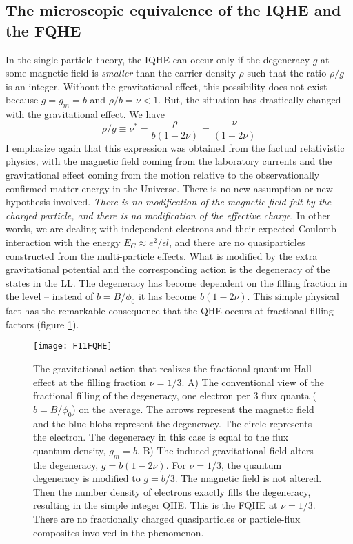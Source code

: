 \documentclass[aps,preprint,12pt,tightenlines]{revtex4}%
\begin{document}
\subsection{The microscopic equivalence of the IQHE and the FQHE}
In the single particle theory, the IQHE can occur only if the degeneracy $g$
at some magnetic field is \emph{smaller} than the carrier density $\rho$ such
that the ratio $\rho/g$ is an integer. Without the gravitational effect, this
possibility does not exist because $g=g_{m}=b$ and $\rho/b=\nu<1$. But, the
situation has drastically changed with the gravitational effect. We have
\begin{equation}
\rho/g\equiv\nu^{\ast}=\frac{\rho}{b\left(  1-2\nu\right)  }=\frac{\nu
}{\left(  1-2\nu\right)  } \label{qhe-ratio}%
\end{equation}
I emphasize again that this expression was obtained from the factual
relativistic physics, with the magnetic field coming from the laboratory
currents and the gravitational effect coming from the motion relative to the
observationally confirmed matter-energy in the Universe. There is no new
assumption or new hypothesis involved. \emph{There is no modification of the
magnetic field felt by the charged particle, and there is no modification of
the effective charge}. In other words, we are dealing with independent
electrons and their expected Coulomb interaction with the energy $E_{C}\approx
e^{2}/\epsilon l$, and there are no quasiparticles constructed from the
multi-particle effects. What is modified by the extra gravitational potential
and the corresponding action is the degeneracy of the states in the LL. The degeneracy has become dependent on the filling fraction in the
level -- instead of $b=B/\phi_{0}$ it has become $b\left(  1-2\nu\right)  $.
This simple physical fact has the remarkable consequence that the QHE occurs
at fractional filling factors (figure \ref{fig:fqhe}).
\begin{figure}
	\centering
	\texttt{[image: F11FQHE]}
	\caption{The gravitational action that realizes the fractional quantum Hall effect at the filling fraction $\nu=1/3$.  A) The conventional view of the fractional filling of the degeneracy, one electron per 3 flux quanta ($b=B/\phi_{0}$) on the average. The arrows represent the magnetic field and the blue blobs represent the degeneracy. The circle represents the electron. The degeneracy in this case is equal to the flux quantum density, $g_m=b$. B) The induced gravitational field alters the degeneracy, $g=b(1-2\nu)$. For $\nu=1/3$, the quantum degeneracy is modified to $g=b/3$. The magnetic field is not altered. Then the number density of electrons exactly fills the degeneracy, resulting in the simple integer QHE.  This is the FQHE at $\nu=1/3$. There are no fractionally charged quasiparticles or particle-flux composites involved in the phenomenon.}
	\label{fig:fqhe}
\end{figure}
\end{document}
